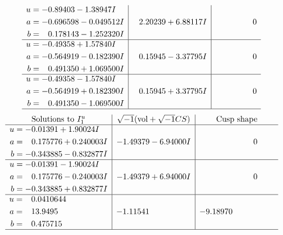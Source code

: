 \documentclass[1p]{elsarticle_modified}
\theoremstyle{definition}
\newcommand{\I}{\sqrt{-1}}
\begin{document}
$$\begin{array}{c|c|c}
\begin{aligned}
u &= -0.89403 - 1.38947 I \\
a &= -0.696598 - 0.049512 I \\
b &= \phantom{-}0.178143 - 1.252320 I\end{aligned}
 & \phantom{-}2.20239 + 6.88117 I & \phantom{-0.000000 } 0 \\ \hline\begin{aligned}
u &= -0.49358 + 1.57840 I \\
a &= -0.564919 - 0.182390 I \\
b &= \phantom{-}0.491350 + 1.069500 I\end{aligned}
 & \phantom{-}0.15945 - 3.37795 I & \phantom{-0.000000 } 0 \\ \hline\begin{aligned}
u &= -0.49358 - 1.57840 I \\
a &= -0.564919 + 0.182390 I \\
b &= \phantom{-}0.491350 - 1.069500 I\end{aligned}
 & \phantom{-}0.15945 + 3.37795 I & \phantom{-0.000000 } 0\\
 \hline 
 \end{array}$$\newpage$$\begin{array}{c|c|c}  
\text{Solutions to }I^u_{1}& \I (\text{vol} + \sqrt{-1}CS) & \text{Cusp shape}\\
 \hline 
\begin{aligned}
u &= -0.01391 + 1.90024 I \\
a &= \phantom{-}0.175776 + 0.240003 I \\
b &= -0.343885 - 0.832877 I\end{aligned}
 & -1.49379 - 6.94000 I & \phantom{-0.000000 } 0 \\ \hline\begin{aligned}
u &= -0.01391 - 1.90024 I \\
a &= \phantom{-}0.175776 - 0.240003 I \\
b &= -0.343885 + 0.832877 I\end{aligned}
 & -1.49379 + 6.94000 I & \phantom{-0.000000 } 0 \\ \hline\begin{aligned}
u &= \phantom{-}0.0410644\phantom{ +0.000000I} \\
a &= \phantom{-}13.9495\phantom{ +0.000000I} \\
b &= \phantom{-}0.475715\phantom{ +0.000000I}\end{aligned}
 & -1.11541\phantom{ +0.000000I} & -9.18970\phantom{ +0.000000I}\\
 \hline 
 \end{array}$$\newpage\newpage\renewcommand{\arraystretch}{1}
\end{document}
